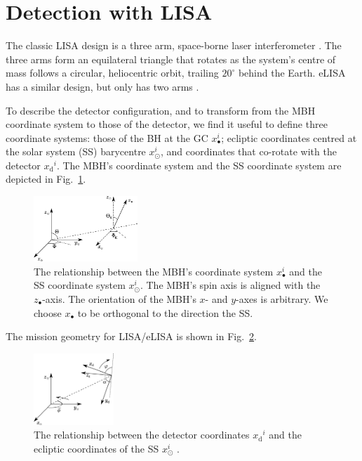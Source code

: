 \documentclass[useAMS,usedcolumn,usegraphicx,usenatbib]{mn2e}
\newcommand{\figref}[1]{Fig.~\ref{fig:#1}}
\newcommand{\sub}[1]{\ensuremath{_\mathrm{#1}}}
\begin{document}
\section{Detection with LISA}\label{sec:Detector}

The classic LISA design is a three arm, space-borne laser interferometer \citep{Bender1998, Danzmann2003}. The three arms form an equilateral triangle that rotates as the system's centre of mass follows a circular, heliocentric orbit, trailing $20^{\circ}$ behind the Earth. eLISA has a similar design, but only has two arms \citep{Jennrich2011}.

To describe the detector configuration, and to transform from the MBH coordinate system to those of the detector, we find it useful to define three coordinate systems: those of the BH at the GC $x_\bullet^i$; ecliptic coordinates centred at the solar system (SS) barycentre $x_\odot^i$, and coordinates that co-rotate with the detector $x\sub{d}^i$. The MBH's coordinate system and the SS coordinate system are depicted in \figref{BH_SS}.
\begin{figure}
\begin{center}
 \includegraphics[width=0.35\textwidth]{BH_SS_angles.eps}
    \caption{The relationship between the MBH's coordinate system $x_\bullet^i$ and the SS coordinate system $x_\odot^i$. The MBH's spin axis is aligned with the $z_\bullet$-axis. The orientation of the MBH's $x$- and $y$-axes is arbitrary. We choose $x_\bullet$ to be orthogonal to the direction the SS.}
   \label{fig:BH_SS}
\end{center}
\end{figure}
The mission geometry for LISA/eLISA is shown in \figref{SS_LISA}.
\begin{figure}
\begin{center}
 \includegraphics[width=0.27\textwidth]{SS_LISA.eps}
    \caption{The relationship between the detector coordinates $x\sub{d}^i$ and the ecliptic coordinates of the SS $x_\odot^i$ \citep{Bender1998, Jennrich2011}.}
   \label{fig:SS_LISA}
\end{center}
\end{figure}
\end{document}
